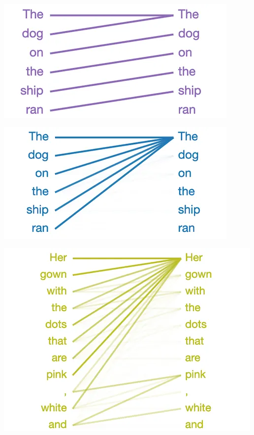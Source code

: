 \documentclass[25pt,a4paper,landscape,headrule,footrule,xetex]{foils}
\begin{document}
\newpage


\noindent\includegraphics[width=\linewidth]{../pics/attention_next-word.png}


\noindent\includegraphics[width=\linewidth]{../pics/attention_default.png}


\noindent\includegraphics[width=0.85\linewidth]{../pics/attention_comma-list.png}
\end{document}
